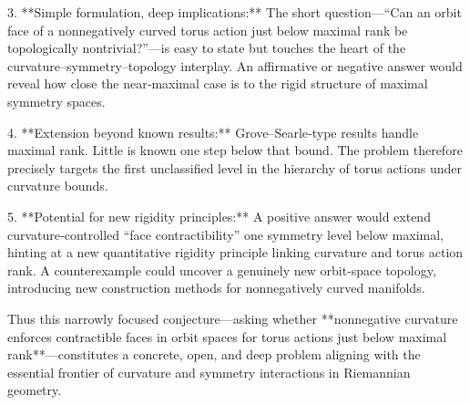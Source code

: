 3. **Simple formulation, deep implications:**  
   The short question—“Can an orbit face of a nonnegatively curved torus action just below maximal rank be topologically nontrivial?”—is easy to state but touches the heart of the curvature–symmetry–topology interplay.  An affirmative or negative answer would reveal how close the near‑maximal case is to the rigid structure of maximal symmetry spaces.

4. **Extension beyond known results:**  
   Grove–Searle‑type results handle maximal rank.  Little is known one step below that bound.  The problem therefore precisely targets the first unclassified level in the hierarchy of torus actions under curvature bounds.

5. **Potential for new rigidity principles:**  
   A positive answer would extend curvature‑controlled “face contractibility” one symmetry level below maximal, hinting at a new quantitative rigidity principle linking curvature and torus action rank.  A counterexample could uncover a genuinely new orbit‑space topology, introducing new construction methods for nonnegatively curved manifolds.

Thus this narrowly focused conjecture—asking whether **nonnegative curvature enforces contractible faces in orbit spaces for torus actions just below maximal rank**—constitutes a concrete, open, and deep problem aligning with the essential frontier of curvature and symmetry interactions in Riemannian geometry.